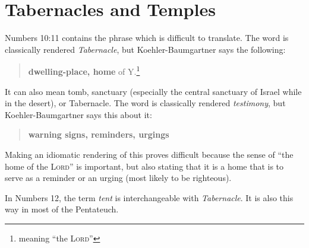 \section{Tabernacles and Temples}\label{app:tabernacle}
Numbers 10:11 contains the phrase  which is difficult to translate. The word  is classically rendered \textit{Tabernacle}, but Koehler-Baumgartner says the following:
\begin{quote}
    \textbf{dwelling-place, home} of Y.\footnote{meaning ``the \textsc{Lord}''}
\end{quote}
It can also mean tomb, sanctuary (especially the central sanctuary of Israel while in the desert), or Tabernacle. The word  is classically rendered \textit{testimony}, but Koehler-Baumgartner says this about it:
\begin{quote}
    \textbf{warning signs, reminders, urgings}
\end{quote}
Making an idiomatic rendering of this proves difficult because the sense of ``the home of the \textsc{Lord}'' is important, but also stating that it is a home that is to serve as a reminder or an urging (most likely to be righteous).

In Numbers 12, the term \textit{tent} is interchangeable with \textit{Tabernacle}. It is also this way in most of the Pentateuch.
